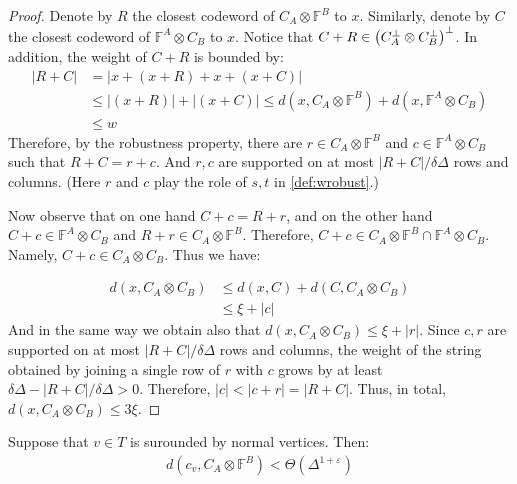  \begin{proof}
Denote by $R$ the closest codeword of $C_{A}\otimes\mathbb{F}^{B}$ to $x$. Similarly, denote by $C$ the closest codeword of $\mathbb{F}^{A} \otimes C_{B}$ to $x$. Notice that $C + R \in \left( C_{A}^{\perp}\otimes C_{B}^{\perp} \right)^{\perp}$. In addition, the weight of $C+R$ is bounded by:
   \begin{equation*}
     \begin{split}
       |R + C| &=  |x + \left(x + R\right) + x + \left( x + C\right)| \\
       & \le |\left(x + R\right)|+ |\left( x + C\right)| \le d\left( x ,   C_{A}\otimes\mathbb{F}^{B} \right) +  d\left( x ,   \mathbb{F}^{A} \otimes C_{B} \right) \\ 
       & \le w
     \end{split}
   \end{equation*}
   Therefore, by the robustness property, there are $r \in C_{A}\otimes\mathbb{F}^{B}$ and $c \in \mathbb{F}^{A} \otimes C_{B} $ such that $ R + C  = r + c$. And $r,c$ are supported on at most $|R+C|/\delta\Delta$ rows and columns. (Here $r$ and $c$ play the role of $s,t$ in \cref{def:wrobust}.)  

   Now observe that on one hand $C + c = R + r$, and on the other hand $ C + c \in \mathbb{F}^{A} \otimes C_{B} $ and $R+r \in C_{A}\otimes\mathbb{F}^{B}$. Therefore, $C+c \in C_{A}\otimes\mathbb{F}^{B} \cap \mathbb{F}^{A} \otimes C_{B}$. Namely, $C +c \in C_{A} \otimes C_{B}$. Thus we have:  
   
   \begin{equation*}
     \begin{split}
       d\left(x, C_{A}\otimes C_{B}\right) & \le d\left(x, C\right) + d\left(C, C_{A}\otimes C_{B} \right) \\
       &\le \xi + |c|
     \end{split}
   \end{equation*}
   And in the same way we obtain also that $d\left( x, C_{A} \otimes C_{B} \right) \le \xi + |r|$. Since $c,r$ are supported on at most $|R+C|/\delta\Delta$ rows and columns, the weight of the string obtained by joining a single row of $r$ with $c$ grows by at least $\delta\Delta - |R+C|/\delta\Delta > 0$. Therefore, $|c| < |c + r| = |R + C|$. Thus, in total, $d\left( x, C_{A} \otimes C_{B} \right) \le 3\xi$.
 \end{proof}
\begin{claim}
  Suppose that $v \in T$ is surounded by normal vertices. Then:
  \begin{equation*}
    \begin{split}
      d\left( c_{v}, C_{A} \otimes \mathbb{F}^{B}\right) < \Theta\left( \Delta^{1+\varepsilon} \right)
    \end{split}
  \end{equation*} 
 \end{claim}
